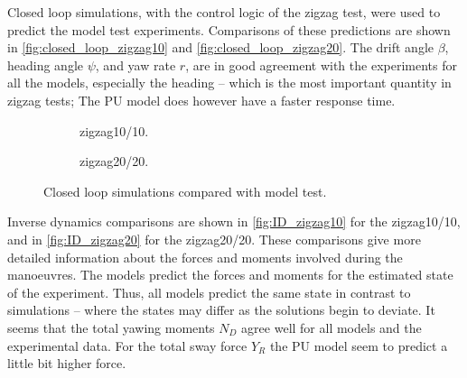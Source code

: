 Closed loop simulations, with the control logic of the zigzag test, were used to predict the model test experiments. Comparisons of these predictions are shown in \autoref{fig:closed_loop_zigzag10} and \autoref{fig:closed_loop_zigzag20}. The drift angle $\beta$, heading angle $\psi$, and yaw rate $r$, are in good agreement with the experiments for all the models, especially the heading -- which is the most important quantity in zigzag tests; The PU model does however have a faster response time.

\begin{figure}
    \centering
    \begin{subfigure}[b]{0.49\textwidth}
        \centering
        
        \caption{zigzag10/10.}
        \label{fig:closed_loop_zigzag10}
    \end{subfigure}
    \hfill
    \begin{subfigure}[b]{0.49\textwidth}
        \centering
        
        \caption{zigzag20/20.}
        \label{fig:closed_loop_zigzag20}
    \end{subfigure}
    \caption{Closed loop simulations compared with model test.}
    \label{fig:closed_loop}
\end{figure}
%    
%    
Inverse dynamics comparisons are shown in \autoref{fig:ID_zigzag10} for the zigzag10/10, and in \autoref{fig:ID_zigzag20} for the zigzag20/20.
These comparisons give more detailed information about the forces and moments involved during the manoeuvres. The models predict the forces and moments for the estimated state of the experiment. Thus, all models predict the same state in contrast to simulations -- where the states may differ as the solutions begin to deviate.    
It seems that the total yawing moments $N_D$ agree well for all models and the experimental data. For the total sway force $Y_R$ the PU model seem to predict a little bit higher force.  
